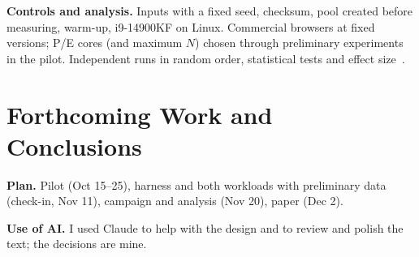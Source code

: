 \documentclass[sigplan]{acmart}
\begin{document}
\noindent\textbf{Controls and analysis.} Inputs with a fixed seed, checksum,
pool created before measuring, warm-up, i9-14900KF on Linux. Commercial browsers at fixed versions; P/E cores (and maximum $N$) chosen through preliminary experiments in the pilot. Independent runs in random order, statistical
tests and effect size~\cite{georges2007,hoefler2015}.

\section{Forthcoming Work and Conclusions} \label{sec:conclusions}

\noindent\textbf{Plan.} Pilot (Oct 15--25), harness and both workloads with
preliminary data (check-in, Nov 11), campaign and analysis (Nov 20), paper
(Dec 2).

\noindent\textbf{Use of AI.} I used Claude to help with the design and to review and
polish the text; the decisions are mine.



\end{document}
